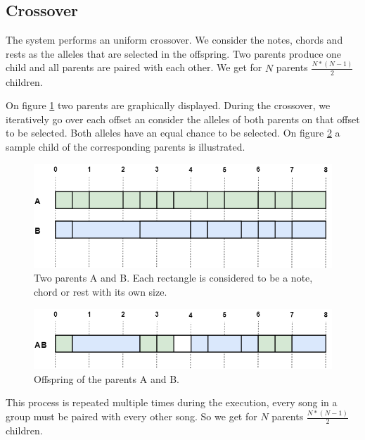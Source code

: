 \subsection{Crossover}
The system performs an uniform crossover. We consider the notes, chords and rests as the alleles that are selected in the offspring. Two parents produce one child and all parents are paired with each other. We get for \(N\) parents \( \frac{N * (N-1)}{2} \) children.

On figure \ref{fig:cross_init} two parents are graphically displayed. During the crossover, we iteratively go over each offset an consider the alleles of both parents on that offset to be selected. Both alleles have an equal chance to be selected. On figure \ref{fig:cross_7} a sample child of the corresponding parents is illustrated.

\begin{figure}[H]
    \includegraphics[width=\linewidth]{Fotos/crossover/init.png}
	\caption{Two parents A and B. Each rectangle is considered to be a note, chord or rest with its own size.}
	\label{fig:cross_init}
\end{figure}

\begin{figure}[H]
\includegraphics[width=\linewidth]{Fotos/crossover/last.png}
\caption{Offspring of the parents A and B.}
\label{fig:cross_7}
\end{figure}


This process is repeated multiple times during the execution, every song in a group must be paired with every other song. So we get for \(N\) parents \( \frac{N * (N-1)}{2} \) children.


